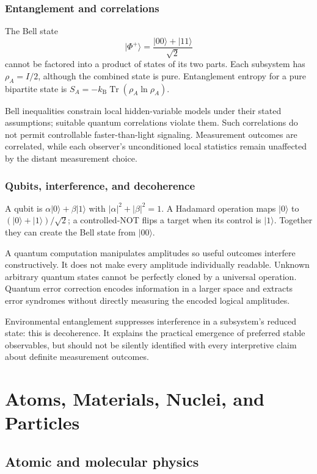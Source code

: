 \documentclass[11pt,oneside]{book}
\newcommand{\ket}[1]{\lvert #1\rangle}
\newcommand{\kb}{k_{\mathrm B}}
\theoremstyle{reviewstyle}
\begin{document}
\section{Entanglement and correlations}
The Bell state
\begin{equation}\ket{\Phi^+}=\frac{\ket{00}+\ket{11}}{\sqrt2}\end{equation}
cannot be factored into a product of states of its two parts. Each subsystem has $\rho_A=I/2$, although the combined state is pure. Entanglement entropy for a pure bipartite state is
$S_A=-\kb\operatorname{Tr}(\rho_A\ln\rho_A)$.

Bell inequalities constrain local hidden-variable models under their stated assumptions; suitable quantum correlations violate them. Such correlations do not permit controllable faster-than-light signaling. Measurement outcomes are correlated, while each observer's unconditioned local statistics remain unaffected by the distant measurement choice.
\section{Qubits, interference, and decoherence}
A qubit is $\alpha\ket0+\beta\ket1$ with $|\alpha|^2+|\beta|^2=1$. A Hadamard operation maps $\ket0$ to $(\ket0+\ket1)/\sqrt2$; a controlled-NOT flips a target when its control is $\ket1$. Together they can create the Bell state from $\ket{00}$.

A quantum computation manipulates amplitudes so useful outcomes interfere constructively. It does not make every amplitude individually readable. Unknown arbitrary quantum states cannot be perfectly cloned by a universal operation. Quantum error correction encodes information in a larger space and extracts error syndromes without directly measuring the encoded logical amplitudes.

Environmental entanglement suppresses interference in a subsystem's reduced state: this is decoherence. It explains the practical emergence of preferred stable observables, but should not be silently identified with every interpretive claim about definite measurement outcomes.

\part{Atoms, Materials, Nuclei, and Particles}
\chapter{Atomic and molecular physics}
\end{document}
